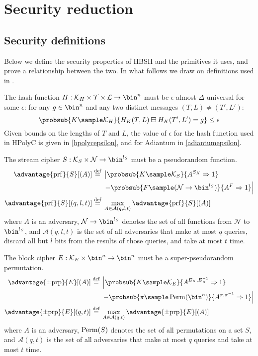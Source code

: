 \documentclass[eprint.tex]{subfiles}
\begin{document}
\section{Security reduction}
\subsection{Security definitions}
Below we define the security properties of HBSH and
the primitives it uses, and prove a relationship between the two.
In what follows we draw on definitions used in \cite{hctr2}.

The hash function
$H: \mathcal{K}_H \times \mathcal{T} \times \mathcal{L} \rightarrow \bin^n$
must be $\epsilon$-almost-$\Delta$-universal\label{eadudef} for some $\epsilon$:
for any $g \in \bin^n$ and
any two distinct messages $(T, L) \neq (T', L')$:
%
\begin{displaymath}
\probsub{K \sample \mathcal{K}_H}{H_{K}(T, L) \boxminus H_{K}(T', L') = g} \leq \epsilon
\end{displaymath}
%
Given bounds on the lengths of $T$ and $L$, the value of $\epsilon$ for the
hash function used in HPolyC is given in \autoref{hpolycepsilon},
and for Adiantum in \autoref{adiantumepsilon}.

The stream cipher
$S: \mathcal{K}_S \times \mathcal{N} \rightarrow \bin^{l_S}$
must be a pseudorandom function.
%
\begin{align*}
    \advantage{\mathrm{prf}}{S}[(A)] \defeq
    {}&\left\lvert \probsub{K \sample \mathcal{K}_S}{A^{S_{K}}\Rightarrow 1}\right.
    \\
    {}&\left. - \probsub{F \sample (\mathcal{N} \rightarrow \bin^{l_S})}
    {A^F\Rightarrow 1} \right\rvert
    \\
    \advantage{\mathrm{prf}}{S}[(q, l, t)]
    \defeq {}&\max_{A \in \mathcal{A}(q, l, t)} \advantage{\mathrm{prf}}{S}[(A)]
\end{align*}
%
where $A$ is an adversary,
$\mathcal{N} \rightarrow \bin^{l_S}$ denotes the set of all
functions from $\mathcal{N}$ to $\bin^{l_S}$,
and
$\mathcal{A}(q, l, t)$
is the set of all adversaries that make at most $q$ queries, discard all but $l$ bits from
the results of those queries, and take at most $t$ time.

The block cipher
$E: \mathcal{K}_E \times \bin^n \rightarrow \bin^n$
must be a super-pseudorandom permutation.
%
\begin{align*}
    \advantage{\pm \mathrm{prp}}{E}[(A)] \defeq
    {}&\left\lvert\probsub{K \sample \mathcal{K}_E}{A^{E_K,E_K^{-1}}\Rightarrow 1}\right.
    \\
    {}&\left. - \probsub{\pi \sample \Perm(\bin^n)}{A^{\pi,\pi^{-1}}\Rightarrow 1}\right\rvert
    \\
    \advantage{\pm \mathrm{prp}}{E}[(q, t)] \defeq
    {}&\max_{A \in \mathcal{A}(q, t)} \advantage{\pm \mathrm{prp}}{E}[(A)]
\end{align*}
%
where $A$ is an adversary,
$\operatorname{Perm}(S)$ denotes the set of all permutations on a set $S$,
and
$\mathcal{A}(q, t)$
is the set of all adversaries that make at most $q$ queries and take at most $t$ time.
\end{document}
